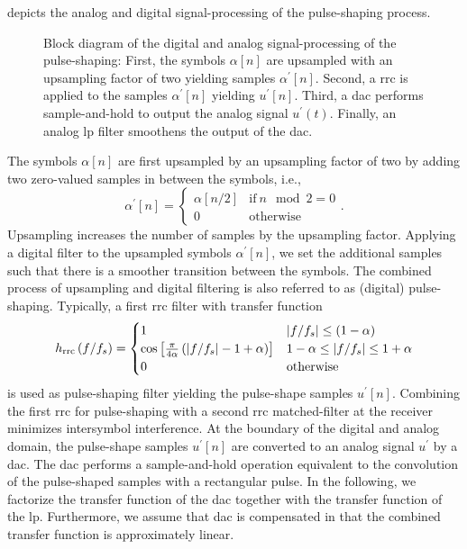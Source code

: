  depicts the analog and digital signal-processing of the pulse-shaping process.
\begin{figure}[htb]
	\centering
	
	\caption{Block diagram of the digital and analog signal-processing of the pulse-shaping: First, the symbols $\alpha[n]$ are upsampled with an upsampling factor of two yielding samples $\alpha^\prime[n]$. Second, a \gls{rrc} is applied to the samples $\alpha^\prime[n]$ yielding $u^\prime[n]$. Third, a \gls{dac} performs sample-and-hold to output the analog signal $u^\prime(t)$. Finally, an analog \gls{lp} filter smoothens the output of the \gls{dac}.}\label{fig:pulse_shaping_block}
\end{figure}
The symbols $\alpha[n]$ are first upsampled by an upsampling factor of two by adding two zero-valued samples in between the symbols, i.e.,
\begin{equation}
	\alpha^\prime[n]
	=
	\begin{cases}
		\alpha[n/2] & \text{if}\ n\mod2=0 \\
		0 & \text{otherwise}
	\end{cases}
	.
\end{equation}
Upsampling increases the number of samples by the upsampling factor.
Applying a digital filter to the upsampled symbols $\alpha^\prime[n]$, we set the additional samples such that there is a smoother transition between the symbols.
The combined process of upsampling and digital filtering is also referred to as (digital) pulse-shaping.
Typically, a first \gls{rrc} filter with transfer function~\cite[p.~33]{Nossek2015}
\begin{equation}
	h_\text{rrc}\left(f/f_s\right)
	=
	\begin{cases}
		1 & \abs{f/f_s}\leq(1-\alpha) \\
		\cos\left[\frac{\pi}{4\alpha}\left(\abs{f/f_s}-1+\alpha\right)\right] & 1-\alpha\leq\abs{f/f_s}\leq1+\alpha \\
		0 & \text{otherwise}
	\end{cases}
\end{equation}
is used as pulse-shaping filter yielding the pulse-shape samples $u^\prime[n]$.
Combining the first \gls{rrc} for pulse-shaping with a second \gls{rrc} matched-filter at the receiver minimizes intersymbol interference.
At the boundary of the digital and analog domain, the pulse-shape samples $u^\prime[n]$ are converted to an analog signal $u^\prime$ by a \gls{dac}.
The \gls{dac} performs a sample-and-hold operation equivalent to the convolution of the pulse-shaped samples with a rectangular pulse.
In the following, we factorize the transfer function of the \gls{dac} together with the transfer function of the \gls{lp}.
Furthermore, we assume that \gls{dac} is compensated in that the combined transfer function is approximately linear.

